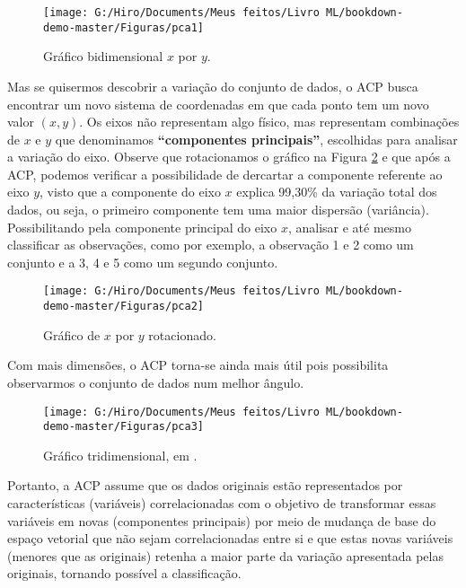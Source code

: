 \documentclass[
]{book}
\begin{document}
\begin{figure}

{\centering \texttt{[image: G:/Hiro/Documents/Meus feitos/Livro ML/bookdown-demo-master/Figuras/pca1]} 

}

\caption{Gráfico bidimensional \(x\) por \(y\).}\label{fig:pca1}
\end{figure}



Mas se quisermos descobrir a variação do conjunto de dados, o ACP busca encontrar um novo sistema de coordenadas em que cada ponto tem um novo valor \((x, y)\). Os eixos não representam algo físico, mas representam combinações de \(x\) e \(y\) que denominamos \textbf{``componentes principais''}, escolhidas para analisar a variação do eixo. Observe que rotacionamos o gráfico na Figura \ref{fig:pca2} e que após a ACP, podemos verificar a possibilidade de dercartar a componente referente ao eixo \(y\), visto que a componente do eixo \(x\) explica 99,30\% da variação total dos dados, ou seja, o primeiro componente tem uma maior dispersão (variância). Possibilitando pela componente principal do eixo \(x\), analisar e até mesmo classificar as observações, como por exemplo, a observação 1 e 2 como um conjunto e a 3, 4 e 5 como um segundo conjunto.

\begin{figure}

{\centering \texttt{[image: G:/Hiro/Documents/Meus feitos/Livro ML/bookdown-demo-master/Figuras/pca2]} 

}

\caption{Gráfico de \(x\) por \(y\) rotacionado.}\label{fig:pca2}
\end{figure}



Com mais dimensões, o ACP torna-se ainda mais útil pois possibilita observarmos o conjunto de dados num melhor ângulo.

\begin{figure}

{\centering \texttt{[image: G:/Hiro/Documents/Meus feitos/Livro ML/bookdown-demo-master/Figuras/pca3]} 

}

\caption{Gráfico tridimensional, em \citet{powellpca}.}\label{fig:pca3}
\end{figure}



Portanto, a ACP assume que os dados originais estão representados por características (variáveis) correlacionadas com o objetivo de transformar essas variáveis em novas (componentes principais) por meio de mudança de base do espaço vetorial que não sejam correlacionadas entre si e que estas novas variáveis (menores que as originais) retenha a maior parte da variação apresentada pelas originais, tornando possível a classificação.
\end{document}
